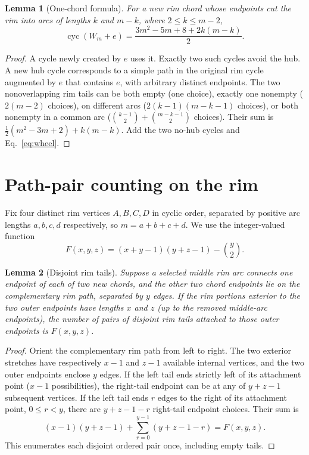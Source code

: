 \documentclass[9pt,a4paper,twocolumn]{extarticle}
\newtheorem{lemma}{Lemma}
\newcommand{\cyc}{\operatorname{cyc}}
\begin{document}
\begin{lemma}[One-chord formula]\label{lem:one}
For a new rim chord whose endpoints cut the rim into arcs of lengths $k$ and $m-k$, where $2\leq k\leq m-2$,
\begin{equation}\label{eq:one}
\cyc(W_m+e)=\frac{3m^2-5m+8+2k(m-k)}{2}.
\end{equation}
\end{lemma}
\begin{proof}
A cycle newly created by $e$ uses it. Exactly two such cycles avoid the hub. A new hub cycle corresponds to a simple path in the original rim cycle augmented by $e$ that contains $e$, with arbitrary distinct endpoints. The two nonoverlapping rim tails can be both empty (one choice), exactly one nonempty ($2(m-2)$ choices), on different arcs ($2(k-1)(m-k-1)$ choices), or both nonempty in a common arc ($\binom{k-1}{2}+\binom{m-k-1}{2}$ choices). Their sum is $\tfrac12(m^2-3m+2)+k(m-k)$. Add the two no-hub cycles and Eq.~\eqref{eq:wheel}.
\end{proof}

\section{Path-pair counting on the rim}
Fix four distinct rim vertices $A,B,C,D$ in cyclic order, separated by positive arc lengths $a,b,c,d$ respectively, so $m=a+b+c+d$. We use the integer-valued function
\begin{equation}\label{eq:F}
F(x,y,z)=(x+y-1)(y+z-1)-\binom{y}{2}.
\end{equation}

\begin{lemma}[Disjoint rim tails]\label{lem:F}
Suppose a selected middle rim arc connects one endpoint of each of two new chords, and the other two chord endpoints lie on the complementary rim path, separated by $y$ edges. If the rim portions exterior to the two outer endpoints have lengths $x$ and $z$ (up to the removed middle-arc endpoints), the number of pairs of disjoint rim tails attached to those outer endpoints is $F(x,y,z)$.
\end{lemma}
\begin{proof}
Orient the complementary rim path from left to right. The two exterior stretches have respectively $x-1$ and $z-1$ available internal vertices, and the two outer endpoints enclose $y$ edges. If the left tail ends strictly left of its attachment point ($x-1$ possibilities), the right-tail endpoint can be at any of $y+z-1$ subsequent vertices. If the left tail ends $r$ edges to the right of its attachment point, $0\leq r<y$, there are $y+z-1-r$ right-tail endpoint choices. Their sum is
\[
(x-1)(y+z-1)+\sum_{r=0}^{y-1}(y+z-1-r)=F(x,y,z).
\]
This enumerates each disjoint ordered pair once, including empty tails.
\end{proof}
\end{document}
